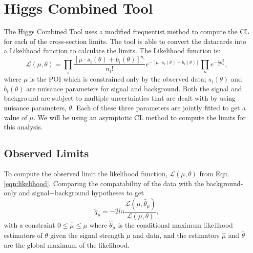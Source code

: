 \section{Higgs Combined Tool}\label{sec:HiggsCombined}

The Higgs Combined Tool \cite{noauthor_procedure_2011} uses a modified frequentist method to compute the CL \cite{read_presentation_2002, junk_confidence_1999, read_modified_2000} for each of the cross-section limits. The tool is able to convert the datacards into a Likelihood function to calculate the limits. The Likelihood function is:
\begin{equation}\label{eqn:likelihood}
\mathcal{L}(\mu,\theta)=\prod_i \frac{[\mu\cdot s_i(\theta)+b_i(\theta)]^{n_i}}{n_i !}e^{-[\mu\cdot s_i(\theta)+b_i(\theta)]}\prod_\kappa e^{-\frac{1}{2}\theta^2_\kappa},
\end{equation}
where $\mu$ is the POI which is constrained only by the observed data; $s_i(\theta)$ and $b_i(\theta)$ are nuisance parameters for signal and background. Both the signal and background are subject to multiple uncertainties that are dealt with by using nuisance parameters, $\theta$. Each of these three parameters are jointly fitted to get a value of $\mu$. We will be using an asymptotic CL method to compute the limits for this analysis. 

\subsection{Observed Limits}\label{sec:ObsLimits}

To compute the observed limit the likelihood function, $\mathcal{L}(\mu,\theta)$ from Eqn. \ref{eqn:likelihood}. Comparing the compatability of the data with the background-only and signal+background hypotheses to get 
\begin{equation}
\widetilde{q}_\mu=-2 ln\frac{\mathcal{L}(\mu,\hat{\theta}_\mu)}{\mathcal{L}(\mu,\theta)},
\end{equation}
with a constraint $0\leq\hat{\mu}\leq\mu$ where $\hat{\theta}_\mu$ is the conditional maximum likelihood estimators of $\theta$ given the signal strength $\mu$ and data, and the estimators $\hat{\mu}$ and $\hat{\theta}$ are the global maximum of the likelihood. 

